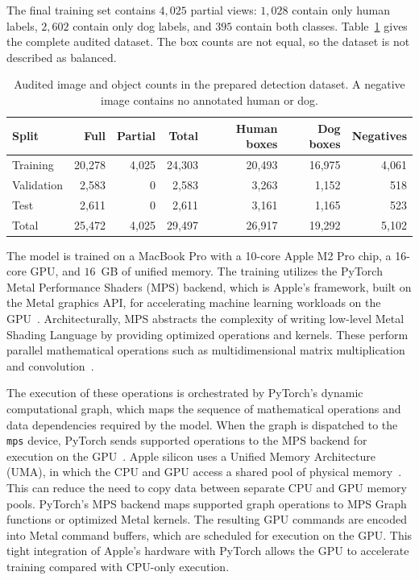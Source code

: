 \documentclass[a4paper,12pt]{report}
\begin{document}
The final training set contains $4,025$ partial views: $1,028$ contain only human labels, $2,602$
contain only dog labels, and $395$ contain both classes. Table~\ref{tab:vision-dataset} gives the
complete audited dataset. The box counts are not equal, so the dataset is not described as balanced.

\begin{table}[H]
\centering
\small
\begin{tabular}{lrrrrrr}
\hline
\textbf{Split} & \textbf{Full} & \textbf{Partial} & \textbf{Total} &
\textbf{Human boxes} & \textbf{Dog boxes} & \textbf{Negatives} \\
\hline
Training   & 20,278 & 4,025 & 24,303 & 20,493 & 16,975 & 4,061 \\
Validation & 2,583  & 0     & 2,583  & 3,263  & 1,152  & 518 \\
Test       & 2,611  & 0     & 2,611  & 3,161  & 1,165  & 523 \\
\hline
Total      & 25,472 & 4,025 & 29,497 & 26,917 & 19,292 & 5,102 \\
\hline
\end{tabular}
\caption{Audited image and object counts in the prepared detection dataset. A negative image
contains no annotated human or dog.}
\label{tab:vision-dataset}
\end{table}

The model is trained on a MacBook Pro with a 10-core Apple M2 Pro chip, a 16-core GPU, and $16$~GB
of unified memory. The training utilizes the PyTorch Metal Performance Shaders (MPS)
backend, which is Apple's framework, built on the Metal graphics API, for accelerating machine
learning workloads on the GPU~\parencite{applemetal,pytorchmps}. Architecturally, MPS abstracts the
complexity of writing low-level Metal Shading Language by providing optimized operations and
kernels. These perform parallel mathematical operations such as multidimensional matrix
multiplication and convolution~\parencite{pytorchmps}.

The execution of these operations is orchestrated by PyTorch's dynamic computational graph, which
maps the sequence of mathematical operations and data dependencies required by the model. When
the graph is dispatched to the \texttt{mps} device, PyTorch sends supported operations to the
MPS backend for execution on the GPU~\parencite{pytorchmps}. Apple silicon uses a Unified Memory
Architecture (UMA), in which the CPU and GPU access a shared pool of physical
memory~\parencite{appleshared}. This can reduce the need to copy data between separate CPU and GPU
memory pools. PyTorch's MPS backend maps supported graph operations to MPS Graph functions or
optimized Metal kernels. The resulting GPU commands are encoded into Metal command buffers, which
are scheduled for execution on the GPU\@. This tight integration of Apple's hardware with PyTorch
allows the GPU to accelerate training compared with CPU-only execution.
\end{document}
